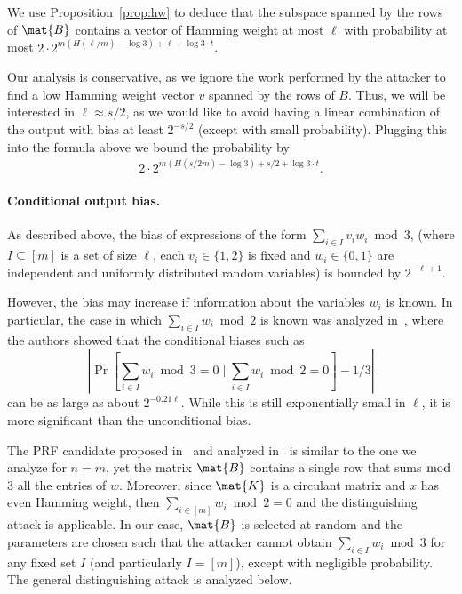 We use Proposition~\ref{prop:hw} to deduce
that the subspace spanned by the rows of $\mat{B}$ contains a vector of Hamming weight at most $\ell$ with probability at most
$2 \cdot 2^{m (H(\ell/m) - \log 3) + \ell + \log 3 \cdot t}$.

Our analysis is conservative, as we ignore the work performed
by the attacker to find a low Hamming weight vector $v$ spanned by the rows of $B$.
Thus, we will be interested in $\ell \approx s/2$,
as we would like to avoid having a linear combination of the output with bias at least $2^{-s/2}$
(except with small probability).
Plugging this into the formula above we bound the probability by
\begin{align}
\label{eq:bias}
2 \cdot 2^{m (H(s/2m) - \log 3) + s/2 + \log 3 \cdot t}.
\end{align}

\paragraph{Conditional output bias.}
As described above, the bias of expressions of the form $\sum_{i \in I} v_i w_i \bmod 3$,
(where $I \subseteq [m]$ is a set of size $\ell$, each $v_i \in \{1,2\}$ is fixed and $w_i \in \{0,1\}$
are independent and uniformly distributed random variables) is bounded by $2^{-\ell+1}$.

However, the bias may increase if information about the variables $w_i$ is known.
In particular, the case in which $\sum_{i \in I} w_i \bmod 2$ is known was analyzed in~\cite{cheon2020-adventures},
where the authors showed that the conditional biases such as
$$\left| \Pr \left[\sum_{i \in I} w_i \bmod 3 = 0 \mid \sum_{i \in I} w_i \bmod 2 = 0 \right] - 1/3 \right|$$
can be as large as about $2^{-0.21\ell}$.
While this is still exponentially small in $\ell$,
it is more significant than the unconditional bias.

The PRF candidate proposed in~\cite{boneh2018-darkmatter} and analyzed in~\cite{cheon2020-adventures}
is similar to the one we analyze for $n = m$,
yet the matrix $\mat{B}$ contains a single row that sums $\bmod$ 3 all the entries of $w$.
Moreover, since $\mat{K}$ is a circulant matrix and $x$ has even Hamming weight,
then $\sum_{i \in [m]} w_i \bmod 2 = 0$ and the distinguishing attack is applicable.
In our case, $\mat{B}$ is selected at random and the parameters are chosen
such that the attacker cannot obtain $\sum_{i \in I} w_i \bmod 3$ for any fixed set $I$ (and particularly $I = [m]$),
except with negligible probability.
The general distinguishing attack is analyzed below.

